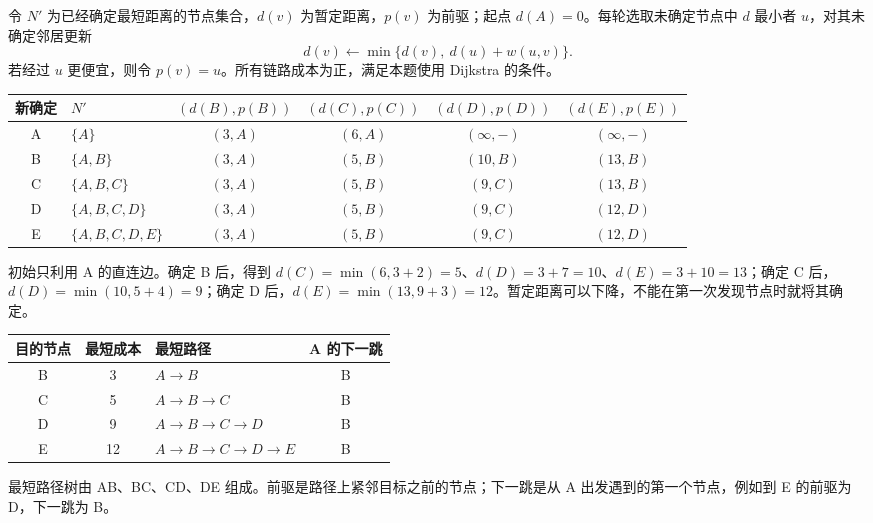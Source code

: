 \begin{checkedsolution}
令 $N'$ 为已经确定最短距离的节点集合，$d(v)$ 为暂定距离，$p(v)$ 为前驱；起点 $d(A)=0$。每轮选取未确定节点中 $d$ 最小者 $u$，对其未确定邻居更新
\[
 d(v)\leftarrow\min\{d(v),\ d(u)+w(u,v)\}.
\]
若经过 $u$ 更便宜，则令 $p(v)=u$。所有链路成本为正，满足本题使用 Dijkstra 的条件。

\begin{center}
\small
\begin{tabular}{@{}clcccc@{}}
\toprule
新确定 & $N'$ & $(d(B),p(B))$ & $(d(C),p(C))$ & $(d(D),p(D))$ & $(d(E),p(E))$ \\
\midrule
A & $\{A\}$ & $(3,A)$ & $(6,A)$ & $(\infty,-)$ & $(\infty,-)$ \\
B & $\{A,B\}$ & $(3,A)$ & $(5,B)$ & $(10,B)$ & $(13,B)$ \\
C & $\{A,B,C\}$ & $(3,A)$ & $(5,B)$ & $(9,C)$ & $(13,B)$ \\
D & $\{A,B,C,D\}$ & $(3,A)$ & $(5,B)$ & $(9,C)$ & $(12,D)$ \\
E & $\{A,B,C,D,E\}$ & $(3,A)$ & $(5,B)$ & $(9,C)$ & $(12,D)$ \\
\bottomrule
\end{tabular}
\end{center}

初始只利用 A 的直连边。确定 B 后，得到 $d(C)=\min(6,3+2)=5$、$d(D)=3+7=10$、$d(E)=3+10=13$；确定 C 后，$d(D)=\min(10,5+4)=9$；确定 D 后，$d(E)=\min(13,9+3)=12$。暂定距离可以下降，不能在第一次发现节点时就将其确定。

\begin{center}
\small
\begin{tabular}{@{}cclc@{}}
\toprule
目的节点 & 最短成本 & 最短路径 & A 的下一跳 \\
\midrule
B & 3 & $A\to B$ & B \\
C & 5 & $A\to B\to C$ & B \\
D & 9 & $A\to B\to C\to D$ & B \\
E & 12 & $A\to B\to C\to D\to E$ & B \\
\bottomrule
\end{tabular}
\end{center}
最短路径树由 AB、BC、CD、DE 组成。前驱是路径上紧邻目标之前的节点；下一跳是从 A 出发遇到的第一个节点，例如到 E 的前驱为 D，下一跳为 B。
\end{checkedsolution}
\endgroup
